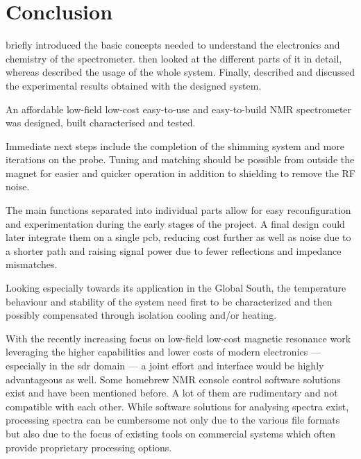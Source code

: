 \chapter{Conclusion}

 briefly introduced the basic concepts needed to understand the electronics and chemistry of the spectrometer.  then looked at the different parts of it in detail, whereas  described the usage of the whole system. Finally,  described and discussed the experimental results obtained with the designed system.

An affordable low-field low-cost easy-to-use and easy-to-build NMR spectrometer was designed, built characterised and tested.

Immediate next steps include the completion of the shimming system and more iterations on the probe. Tuning and matching should be possible from outside the magnet for easier and quicker operation in addition to shielding to remove the RF noise.

The main functions separated into individual parts allow for easy reconfiguration and experimentation during the early stages of the project. A final design could later integrate them on a single \acrshort{pcb}, reducing cost further as well as noise due to a shorter path and raising signal power due to fewer reflections and impedance mismatches.

Looking especially towards its application in the Global South, the temperature behaviour and stability of the system need first to be characterized and then possibly compensated through isolation cooling and/or heating.

With the recently increasing focus on low-field low-cost magnetic resonance work leveraging the higher capabilities and lower costs of modern electronics --- especially in the \acrshort{sdr} domain --- a joint effort and interface would be highly advantageous as well. Some homebrew NMR console control software solutions exist and have been mentioned before. A lot of them are rudimentary and not compatible with each other. While software solutions for analysing spectra exist, processing spectra can be cumbersome not only due to the various file formats but also due to the focus of existing tools on commercial systems which often provide proprietary processing options.

